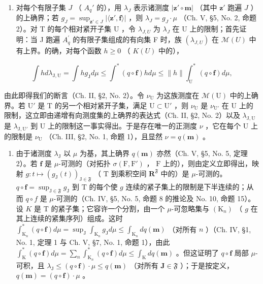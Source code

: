 \begin{enumerate}
\def\labelenumi{\alph{enumi})}
\tightlist
\item
  对每个有限子集 \(J\) （ \(A_q'\) 的），用 \(\lambda_J\) 表示诸测度 \(|\mathbf{z}' \circ \mathbf{m}|\) （其中 \(\mathbf{z}'\) 跑遍 \(J\) ）的上确界；若 \(g_J = \sup_{\mathbf{z}' \in J} |\langle \mathbf{z}', \mathbf{f} \rangle|\) ，则 \(\lambda_{J}=g_{J}\cdot\mu\) （Ch. V, §5, No. 2, 命题 2）。对 T 的每个相对紧开子集 U ，令 \(\lambda_{J,U}\) 为 \(\lambda_{J}\) 在 U 上的限制；首先证明：当 J 跑遍 \(A_{q}^{\prime}\) 的有限子集组成的有向集 F 时，族 \((\lambda_{J,U})\) 在 \(\mathcal{M}(U)\) 中有上界。的确，对每个函数 \(h\geqslant0\) （ \(K(U)\) 中的），
\end{enumerate}

\[
\int h d \lambda_ {\mathrm{J}, \mathrm{U}} = \int h g _ {\mathrm{J}} d \mu \leqslant \int^ {*} (q \circ \mathbf {f}) h d \mu \leqslant \| h \| \int_ {\mathrm{U}} ^ {*} (q \circ \mathbf {f}) d \mu ,
\]

由此即得我们的断言（Ch. II, §2, No. 2）。令 \(\nu_{\mathrm{U}}\) 为这族测度在 \(\mathcal{M}(\mathrm{U})\) 中的上确界。若 \(\mathrm{U}'\) 是 T 的另一个相对紧开子集，满足 \(\mathrm{U} \subset \mathrm{U}'\) ，则 \(\nu_{\mathrm{U}}\) 是 \(\nu_{\mathrm{U}'}\) 在 U 上的限制，这立即由递增有向测度集的上确界的表达式（Ch. II, §2, No. 2）以及 \(\lambda_{\mathrm{J,U}}\) 是 \(\lambda_{\mathrm{J,U}'}\) 到 U 上的限制这一事实得出。于是存在唯一的正测度 \(\nu\) ，它在每个 U 上的限制是 \(\nu_{\mathrm{U}}\) （Ch. III, §2, No. 1, 命题 1），且显然 \(\nu = q(\mathbf{m})\) 。

\begin{enumerate}
\def\labelenumi{\alph{enumi})}
\setcounter{enumi}{1}
\tightlist
\item
  由于诸测度 \(\lambda_{\mathrm{J}}\) 以 \(\mu\) 为基，其上确界 \(q(\mathbf{m})\) 亦然（Ch. V, §5, No. 5, 定理 2）。若 \(\mathbf{f}\) 是 \(\mu\)-可测的（对拓扑 \(\sigma(\mathrm{F},\mathrm{F}')\) ， \(\mathrm{F}\) 上的），则由定义立即得出，映射 \(g:t\mapsto(g_{\mathrm{J}}(t))_{\mathrm{J}\in\mathfrak{F}}\) （ \(\mathrm{T}\) 到乘积空间 \(\mathbf{R}^{\mathfrak{F}}\) 中的）是 \(\mu\)-可测的。 \(q\circ\mathbf{f}=\sup_{\mathrm{J}\in\mathfrak{F}}g_{\mathrm{J}}\) 到 \(\mathrm{T}\) 的每个使 \(g\) 连续的紧子集上的限制是下半连续的；从而 \(q \circ f\) 是 \(\mu\)-可测的（Ch. IV, §5, No. 5, 命题 8 的推论及 No. 10, 命题 15）。设 \(K\) 是 T 的紧子集；它容许一个分割，由一个 \(\mu\)-可忽略集与 \((\mathrm{K}_n)\) （ \(g\) 在其上连续的紧集序列）组成。这时 \(\int_{\mathrm{K}_n}^*\left(q\circ \mathbf{f}\right)d\mu = \sup_{\mathrm{J}}\int_{\mathrm{K}_n}g_{\mathrm{J}}d\mu \leqslant \int_{\mathrm{K}_n}dq(\mathbf{m})\) （对所有 \(n\) ）（Ch. IV, §1, No. 1, 定理 1 与 Ch. V, §7, No. 1, 命题 1），由此 \(\int_{\mathrm{K}}^{*}(q\circ \mathbf{f})d\mu = \sum_{n}\int_{\mathrm{K}_n}^*\left(q\circ \mathbf{f}\right)d\mu \leqslant \int_{\mathrm{K}}dq(\mathbf{m})\) 。但这证明了 \(q\circ \mathbf{f}\) 局部 \(\mu\)-可积，且 \(\lambda_{\mathrm{J}}\leqslant (q\circ \mathbf{f})\cdot \mu \leqslant q(\mathbf{m})\) （对所有 \(\mathbf{J}\in \mathfrak{F}\) ）；于是按定义， \(q(\mathbf{m}) = (q\circ \mathbf{f})\cdot \mu\) 。
\end{enumerate}

